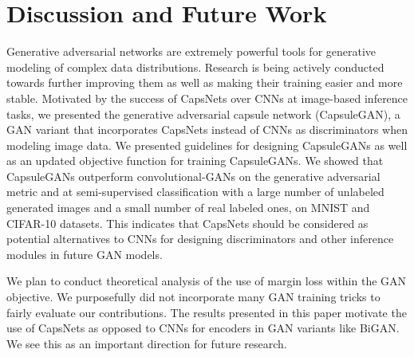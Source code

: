 \section{Discussion and Future Work}
\label{sec:conclusion}

Generative adversarial networks are extremely powerful tools for generative modeling of complex data distributions. Research is being actively conducted towards further improving them as well as making their training easier and more stable. Motivated by the success of CapsNets over CNNs at image-based inference tasks, we presented the generative adversarial capsule network (CapsuleGAN), a GAN variant that incorporates CapsNets instead of CNNs as discriminators when modeling image data. We presented guidelines for designing CapsuleGANs as well as an updated objective function for training CapsuleGANs. We showed that CapsuleGANs outperform convolutional-GANs on the generative adversarial metric and at semi-supervised classification with a large number of unlabeled generated images and a small number of real labeled ones, on  MNIST and CIFAR-10 datasets. This indicates that CapsNets should be considered as potential alternatives to CNNs for designing discriminators and other inference modules in future GAN models.

We plan to conduct theoretical analysis of the use of margin loss within the GAN objective. We purposefully did not incorporate many GAN training tricks to fairly evaluate our contributions. The results presented in this paper motivate the use of CapsNets as opposed to CNNs for encoders in GAN variants like BiGAN. We see this as an important direction for future research.